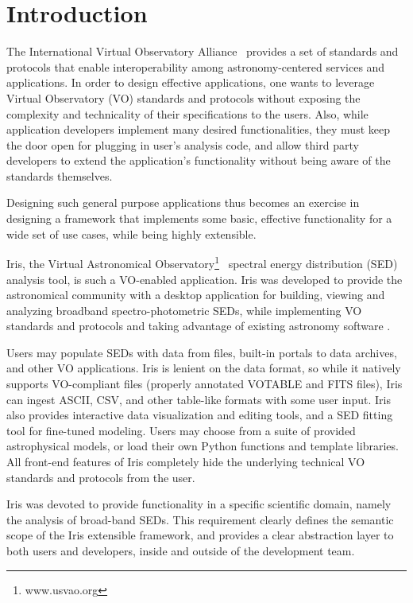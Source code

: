 \documentclass[5p]{elsarticle}
\begin{document}
\section{Introduction} 
The International Virtual Observatory Alliance~\citep{2004SPIE.5493..137Q} provides a set of standards and protocols that enable interoperability among astronomy-centered services and applications.
In order to design effective applications, one wants to leverage Virtual Observatory (VO) standards and protocols without exposing the complexity and technicality of their specifications to the users. Also, while application developers implement many desired functionalities, they must keep the door open for plugging in user's analysis code, and allow third party developers to extend the application's functionality without being aware of the standards themselves.

Designing such general purpose applications thus becomes an exercise in designing a framework that implements some basic, effective functionality for a wide set of use cases, while being highly extensible.

Iris, the Virtual Astronomical Observatory\footnote{www.usvao.org}~\citep{2012SPIE.8449E..0HB} spectral energy distribution (SED) analysis tool, is such a VO-enabled application. Iris was developed to provide the astronomical community with a desktop application for building, viewing and analyzing broadband spectro-photometric SEDs, while implementing VO standards and protocols and taking advantage of existing astronomy software \citep{2012ASPC..461..893D,2013AAS...22124038L}.

Users may populate SEDs with data from files, built-in portals to data archives, and other VO applications. Iris is lenient on the data format, so while it natively supports VO-compliant files (properly annotated VOTABLE and FITS files), Iris can ingest ASCII, CSV, and other table-like formats with some user input. Iris also provides interactive data visualization and editing tools, and a SED fitting tool for fine-tuned modeling. Users may choose from a suite of provided astrophysical models, or load their own Python functions and template libraries. All front-end features of Iris completely hide the underlying technical VO standards and protocols from the user.

Iris was devoted to provide functionality in a specific scientific domain, namely the analysis of broad-band SEDs. This requirement clearly defines the semantic scope of the  Iris extensible framework, and provides a clear abstraction layer to both users and developers, inside and outside of the development team.
\end{document}
